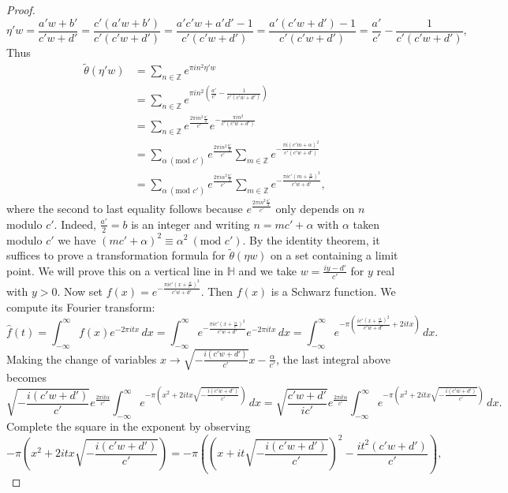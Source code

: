 \documentclass[12pt]{book}
\theoremstyle{definition}\newframedtheorem{method}{Method}
\newcommand{\tmod}[1]{\ \left(\text{mod }#1\right)}
\newcommand{\Z}{\mathbb{Z}}
\renewcommand{\H}{\mathbb{H}}
\renewcommand{\a}{\alpha}
\renewcommand{\t}{\theta}
\newcommand{\<}{\langle}
\renewcommand{\>}{\rangle}
\newcommand{\wtilde}{\widetilde}
\begin{document}
\begin{proof}
      \[
        \eta' w = \frac{a'w+b'}{c'w+d'} = \frac{c'(a'w+b')}{c'(c'w+d')} = \frac{a'c'w+a'd'-1}{c'(c'w+d')} = \frac{a'(c'w+d')-1}{c'(c'w+d')} = \frac{a'}{c'}-\frac{1}{c'(c'w+d')},
      \]
      Thus
      \begin{align*}
        \wtilde{\t}(\eta'w) &= \sum_{n \in \Z}e^{\pi in^{2}\eta'w} \\
        &= \sum_{n \in \Z}e^{\pi in^{2}\left(\frac{a'}{c'}-\frac{1}{c'(c'w+d')}\right)} \\
        &= \sum_{n \in \Z}e^{\frac{2\pi in^{2}\frac{a'}{2}}{c'}}e^{-\frac{\pi in^{2}}{c'(c'w+d')}} \\
        &= \sum_{\a \tmod{c'}}e^{\frac{2\pi in^{2}\frac{a'}{2}}{c'}}\sum_{m \in \Z}e^{-\frac{\pi i(c'm+\a)^{2}}{c'(c'w+d')}} \\
        &= \sum_{\a \tmod{c'}}e^{\frac{2\pi i\a^{2}\frac{a'}{2}}{c'}}\sum_{m \in \Z}e^{-\frac{\pi ic'\left(m+\frac{\a}{c'}\right)^{2}}{c'w+d'}},
      \end{align*}
      where the second to last equality follows because $e^{\frac{2\pi in^{2}\frac{a'}{2}}{c'}}$ only depends on $n$ modulo $c'$. Indeed, $\frac{a'}{2} = b$ is an integer and writing $n = mc'+\a$ with $\a$ taken modulo $c'$ we have $(mc'+\a)^{2} \equiv \a^{2} \tmod{c'}$. By the identity theorem, it suffices to prove a transformation formula for $\wtilde{\t}(\eta w)$ on a set containing a limit point. We will prove this on a vertical line in $\H$ and we take $w = \frac{iy-d'}{c'}$ for $y$ real with $y > 0$. Now set $f(x) = e^{-\frac{\pi ic'\left(x+\frac{\a}{c'}\right)^{2}}{c'w+d'}}$. Then $f(x)$ is a Schwarz function. We compute its Fourier transform:
      \[
        \hat{f}(t) = \int_{-\infty}^{\infty}f(x)e^{-2\pi itx}\,dx = \int_{-\infty}^{\infty}e^{-\frac{\pi ic'\left(x+\frac{\a}{c'}\right)^{2}}{c'w+d'}}e^{-2\pi itx}\,dx = \int_{-\infty}^{\infty}e^{-\pi\left(\frac{ic'\left(x+\frac{\a}{c'}\right)^{2}}{c'w+d'}+2itx\right)}\,dx.
      \]
      Making the change of variables $x \to \sqrt{-\frac{i(c'w+d')}{c'}}x-\frac{\a}{c'}$, the last integral above becomes
      \[
        \sqrt{-\frac{i(c'w+d')}{c'}}e^{\frac{2\pi i t\a}{c'}}\int_{-\infty}^{\infty}e^{-\pi\left(x^{2}+2itx\sqrt{-\frac{i(c'w+d')}{c'}}\right)}\,dx = \sqrt{\frac{c'w+d'}{ic'}}e^{\frac{2\pi i t\a}{c'}}\int_{-\infty}^{\infty}e^{-\pi\left(x^{2}+2itx\sqrt{-\frac{i(c'w+d')}{c'}}\right)}\,dx.
      \]
      Complete the square in the exponent by observing
      \[
        -\pi\left(x^{2}+2itx\sqrt{-\frac{i(c'w+d')}{c'}}\right) = -\pi\left(\left(x+it\sqrt{-\frac{i(c'w+d')}{c'}}\right)^{2}-\frac{it^{2}(c'w+d')}{c'}\right),
\]
\end{proof}
\end{document}
